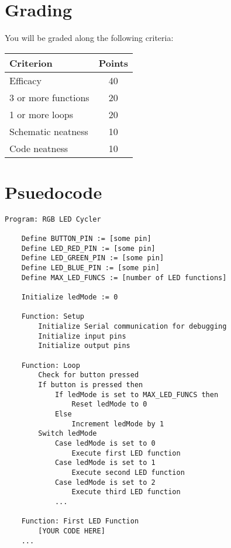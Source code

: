 \section*{Grading}
You will be graded along the following criteria:

\begin{table*}
    \begin{tabular}{ l | c }
        \toprule
        Criterion & Points \\

        \midrule
        Efficacy & 40 \\
        3 or more functions & 20 \\
        1 or more loops & 20 \\
        Schematic neatness & 10 \\
        Code neatness & 10 \\

        \bottomrule
    \end{tabular}
\end{table*}

\section*{Psuedocode}

\begin{lstlisting}[linewidth=1.5\textwidth]
    Program: RGB LED Cycler

    Define BUTTON_PIN := [some pin]
    Define LED_RED_PIN := [some pin]
    Define LED_GREEN_PIN := [some pin]
    Define LED_BLUE_PIN := [some pin]
    Define MAX_LED_FUNCS := [number of LED functions]

    Initialize ledMode := 0

    Function: Setup
        Initialize Serial communication for debugging
        Initialize input pins
        Initialize output pins

    Function: Loop
        Check for button pressed
        If button is pressed then
            If ledMode is set to MAX_LED_FUNCS then
                Reset ledMode to 0
            Else
                Increment ledMode by 1
        Switch ledMode
            Case ledMode is set to 0
                Execute first LED function
            Case ledMode is set to 1
                Execute second LED function
            Case ledMode is set to 2
                Execute third LED function
            ...
    
    Function: First LED Function
        [YOUR CODE HERE]
    ...

\end{lstlisting}

